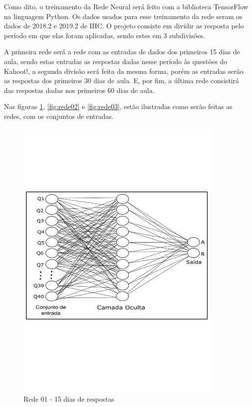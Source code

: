 \documentclass[
	12pt,				%
	openright,			%
	oneside,
	a4paper,			%
	english,			%
	french,				%
	spanish,			%
	brazil,				%
	]{abntex2}
\begin{document}
Como dito, o treinamento da Rede Neural será feito com a biblioteca TensorFlow na linguagem Python. Os dados usados para esse treinamento da rede seram os dados de 2018.2 e 2019.2 de IHC. O projeto consiste em dividir as resposta pelo período em que elas foram aplicadas, sendo estes em 3 subdivisões.

A primeira rede será a rede com as entradas de dados dos primeiros 15 dias de aula, sendo estas entradas as respostas dadas nesse período às questões do Kahoot!, a segunda divisão será feita da mesma forma, porém as entradas serão as respostas dos primeiros 30 dias de aula. E, por fim, a última rede consistirá das respostas dadas nos primeiros 60 dias de aula.

Nas figuras \ref{fig:rede01}, \ref{fig:rede02} e \ref{fig:rede03}, estão ilustradas como serão feitas as redes, com os conjuntos de entradas. 

\begin{figure}
    \centering
    \includegraphics[width=0.9\textwidth]{Modelo_Projeto_Pesquisa_UFG_REJ_BCC/rede01_15.png}
    \caption{Rede 01 - 15 dias de respostas}
    \label{fig:rede01}
\end{figure}
\end{document}
